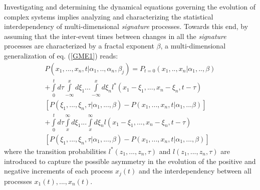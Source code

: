 Investigating and determining the dynamical equations governing the evolution of complex systems implies analyzing and characterizing the statistical interdependency of multi-dimensional \textit{signature} processes. Towards this end, by assuming that the inter-event times between changes in all the \textit{signature} processes are characterized by a fractal exponent $\beta$, a multi-dimensional generalization of eq. (\ref{GME1}) reads:
\begin{eqnarray}
\label{multidimensionalGME}
& P(x_{1},...,x_{n},t | \alpha_{1},..,\alpha_{n}, \beta_{j}) = P_{t=0}(x_{1},..,x_{n}| \alpha_{1},.., \beta)  & \nonumber\\
& + \int\limits_{0}^{t}d\tau \int\limits_{-\infty}^{x} d\xi_{1} ... \int\limits_{-\infty}^{x} d\xi_{n}  l^{*}(x_{1} - \xi_{1},...,x_{n} - \xi_{n}, t - \tau)& \nonumber\\
&    [ P(\xi_{1},...,\xi_{n},\tau | \alpha_{1},..., \beta) - P(x_{1},...,x_{n},t | \alpha_{1},... \beta)  ] & \nonumber\\
&  + \int\limits_{0}^{t}d\tau \int\limits_{x}^{\infty} d\xi_{1} ... \int\limits_{x}^{\infty} d\xi_{n}  l(x_{1} - \xi_{1},...,x_{n} - \xi_{n},t-\tau) &\\
&  [ P(\xi_{1},...,\xi_{n},\tau | \alpha_{1},..., \beta) - P(x_{1},...,x_{n},t | \alpha_{1},..., \beta)  ]  & \nonumber
\end{eqnarray}
where the transition probabilities $l^{*}(z_{1} ,...,z_{n} , \tau)$ and $l(z_{1},...,z_{n},\tau)$ are introduced to capture the possible asymmetry in the evolution of the positive and negative increments of each process $x_{j}(t)$ and the interdependency between all processes $x_{1}(t), ..., x_{n}(t)$. 

